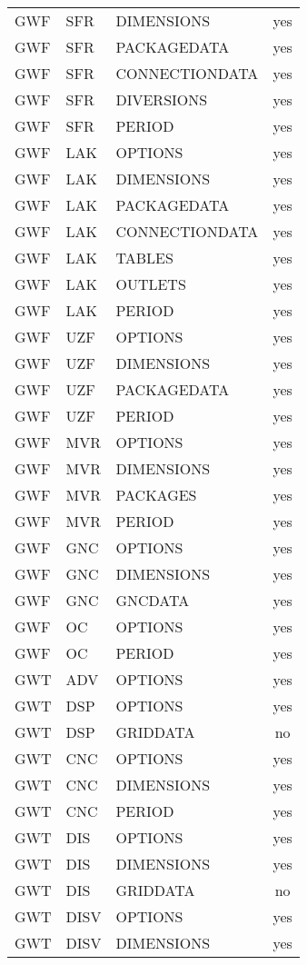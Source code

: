 \begin{longtable}{p{1.5cm} p{1.5cm} p{3cm} c}
GWF & SFR & DIMENSIONS & yes \\ 
GWF & SFR & PACKAGEDATA & yes \\ 
GWF & SFR & CONNECTIONDATA & yes \\ 
GWF & SFR & DIVERSIONS & yes \\ 
GWF & SFR & PERIOD & yes \\ 
\hline
GWF & LAK & OPTIONS & yes \\ 
GWF & LAK & DIMENSIONS & yes \\ 
GWF & LAK & PACKAGEDATA & yes \\ 
GWF & LAK & CONNECTIONDATA & yes \\ 
GWF & LAK & TABLES & yes \\ 
GWF & LAK & OUTLETS & yes \\ 
GWF & LAK & PERIOD & yes \\ 
\hline
GWF & UZF & OPTIONS & yes \\ 
GWF & UZF & DIMENSIONS & yes \\ 
GWF & UZF & PACKAGEDATA & yes \\ 
GWF & UZF & PERIOD & yes \\ 
\hline
GWF & MVR & OPTIONS & yes \\ 
GWF & MVR & DIMENSIONS & yes \\ 
GWF & MVR & PACKAGES & yes \\ 
GWF & MVR & PERIOD & yes \\ 
\hline
GWF & GNC & OPTIONS & yes \\ 
GWF & GNC & DIMENSIONS & yes \\ 
GWF & GNC & GNCDATA & yes \\ 
\hline
GWF & OC & OPTIONS & yes \\ 
GWF & OC & PERIOD & yes \\ 
\hline
GWT & ADV & OPTIONS & yes \\ 
\hline
GWT & DSP & OPTIONS & yes \\ 
GWT & DSP & GRIDDATA & no \\ 
\hline
GWT & CNC & OPTIONS & yes \\ 
GWT & CNC & DIMENSIONS & yes \\ 
GWT & CNC & PERIOD & yes \\ 
\hline
GWT & DIS & OPTIONS & yes \\ 
GWT & DIS & DIMENSIONS & yes \\ 
GWT & DIS & GRIDDATA & no \\ 
\hline
GWT & DISV & OPTIONS & yes \\ 
GWT & DISV & DIMENSIONS & yes \\ 

\end{longtable}
